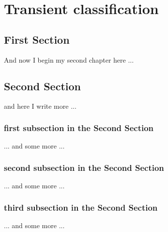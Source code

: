 \chapter{Transient classification}



\ifpdf
    \graphicspath{{Chapter2/Chapter2Figs/PNG/}{Chapter2/Chapter2Figs/PDF/}{Chapter2/Chapter2Figs/}}
\else
    \graphicspath{{Chapter2/Chapter2Figs/EPS/}{Chapter2/Chapter2Figs/}}
\fi

\section{First Section}
And now I begin my second chapter here ...

\section{Second Section}
and here I write more ...

\subsection{first subsection in the Second Section}
... and some more ...

\subsection{second subsection in the Second Section}
... and some more ...

\subsection{third subsection in the Second Section}
... and some more ...


